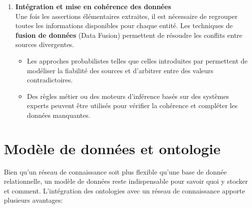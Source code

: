 \documentclass[a4paper,11pt]{report}
\providecommand{\tightlist}{\setlength{\itemsep}{0pt}\setlength{\parskip}{0pt}}
\begin{document}
\begin{enumerate}
  Ce niveau de traçabilité s'appuie sur les normes W3C PROV, qui permettent de modéliser les étapes de transformation des données et de garantir leur auditabilité.
\item
  \textbf{Intégration et mise en cohérence des données}\\
  Une fois les assertions élémentaires extraites, il est nécessaire de regrouper toutes les informations disponibles pour chaque entité. Les techniques de \textbf{fusion de données} (Data Fusion) permettent de résoudre les conflits entre sources divergentes.

  \begin{itemize}
  \tightlist
  \item
    Les approches probabilistes telles que celles introduites par \citep{RI2MXYYS} permettent de modéliser la fiabilité des sources et d'arbitrer entre des valeurs contradictoires.
  \item
    Des règles métier ou des moteurs d'inférence basés sur des systèmes experts peuvent être utilisés pour vérifier la cohérence et compléter les données manquantes.
  \end{itemize}
\end{enumerate}

\section{Modèle de données et ontologie}\label{moduxe8le-de-donnuxe9es-et-ontologie}

Bien qu'un réseau de connaissance soit plus flexible qu'une base de donnée relationnelle, un modèle de données reste indispensable pour savoir quoi y stocker et comment. L'intégration des ontologies avec un réseau de connaissance apporte plusieurs avantages:
\end{document}
